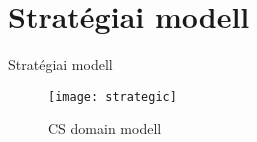 \section{Stratégiai modell}

\begin{frame}{Stratégiai modell}

    \begin{figure}[htbp]
        \centering
        \texttt{[image: strategic]}
        \caption{CS domain modell}
    \end{figure}

\end{frame}